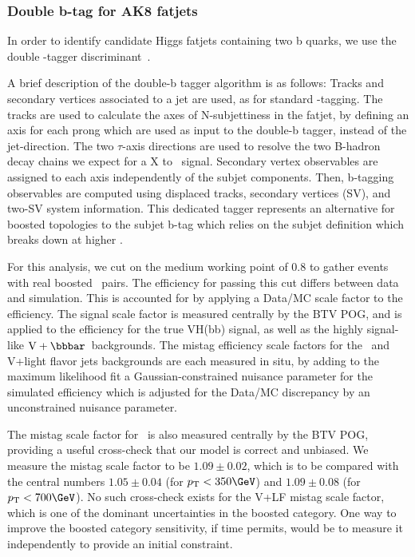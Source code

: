 \subsubsection{Double b-tag for AK8 fatjets}
In order to identify candidate Higgs fatjets containing two b quarks,
we use the double \cPqb-tagger discriminant~\cite{CMS-PAS-BTV-15-002}.

A brief description of the double-b tagger algorithm is as follows:
Tracks and secondary vertices associated to a jet are used, as for standard \cPqb-tagging.
The tracks are used to calculate the axes of N-subjettiness in the fatjet, by defining an axis for each prong which are used as input to the double-b tagger, instead of the jet-direction.
The two $\tau$-axis directions are used to resolve the two B-hadron decay chains we expect for a X to \bbbar\ signal.
Secondary vertex observables are assigned to each axis independently of the subjet components.
Then, b-tagging observables are computed using displaced tracks, secondary vertices (SV), and two-SV system information.
This dedicated tagger represents an alternative for boosted topologies to the subjet b-tag which relies on the subjet definition which breaks down at higher \pt.

For this analysis, we cut on the medium working point of 0.8 to gather events with real boosted \bbbar\ pairs.
The efficiency for passing this cut differs between data and simulation.
This is accounted for by applying a Data/MC scale factor to the efficiency.
The signal scale factor is measured centrally by the BTV POG, and is applied to the efficiency for the true VH(bb) signal,
as well as the highly signal-like \ensuremath{\mathrm{V+\bbbar}}\ backgrounds.
The mistag efficiency scale factors for the \ttbar\ and V+light flavor jets backgrounds are each measured in situ, by
adding to the maximum likelihood fit a Gaussian-constrained nuisance parameter for the simulated efficiency
which is adjusted for the Data/MC discrepancy by an unconstrained nuisance parameter.

The mistag scale factor for \ttbar\ is also measured centrally by the BTV POG, providing a useful cross-check that our
model is correct and unbiased. We measure the \ttbar mistag scale factor to be $\mathbf{1.09 \pm 0.02}$, which is
to be compared with the central numbers $\mathbf{1.05 \pm 0.04}$ (for $\pt < 350 \GeV$) and $\mathbf{1.09 \pm 0.08}$ (for $\pt < 700 \GeV$).
No such cross-check exists for the V+LF mistag scale factor, which is one of the dominant uncertainties in the boosted category.
One way to improve the boosted category sensitivity, if time permits, would be to measure it independently
to provide an initial constraint.

